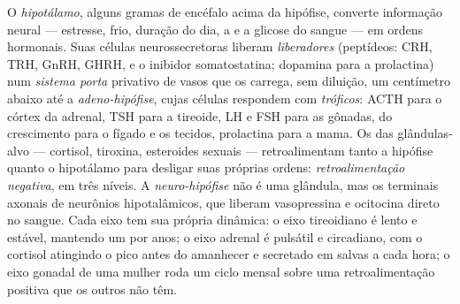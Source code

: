 \begin{definition}[Os eixos]\label{def:b3:endocrinology:axes}
O \emph{hipotálamo}, alguns gramas de encéfalo acima da hipófise,
converte informação neural --- estresse, frio, duração do dia, a
 e a glicose do sangue --- em ordens hormonais. Suas células
neurossecretoras liberam \emph{ liberadores} (peptídeos: CRH,
TRH, GnRH, GHRH, e o inibidor somatostatina; dopamina para a prolactina)
num \emph{sistema porta} privativo de vasos que os carrega, sem
diluição, um centímetro abaixo até a \emph{adeno-hipófise}, cujas
células respondem com \emph{ tróficos}: ACTH para o córtex da
adrenal, TSH para a tireoide, LH e FSH para as gônadas,  do
crescimento para o fígado e os tecidos, prolactina para a mama. Os
 das glândulas-alvo --- cortisol, tiroxina, esteroides sexuais
--- retroalimentam tanto a hipófise quanto o hipotálamo para desligar
suas próprias ordens: \emph{retroalimentação negativa}, em três níveis.
A \emph{neuro-hipófise} não é uma glândula, mas os terminais axonais de
neurônios hipotalâmicos, que liberam vasopressina e ocitocina direto no
sangue. Cada eixo tem sua própria dinâmica: o eixo tireoidiano é lento e
estável, mantendo um  por anos; o eixo adrenal é pulsátil
e circadiano, com o cortisol atingindo o pico antes do amanhecer e
secretado em salvas a cada hora; o eixo gonadal de uma mulher roda um
ciclo mensal sobre uma retroalimentação positiva que os outros não têm.
\end{definition}

